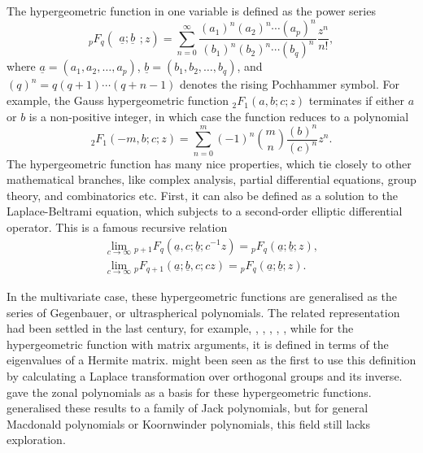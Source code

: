 \documentclass{amsart}
\theoremstyle{definition}
\numberwithin{equation}{section}
\begin{document}
The hypergeometric function in one variable is defined as the power series 
\[{}_{p}F_{q}\left(\begin{matrix}
    	    \underline{a}; \underline{b}\end{matrix}; z\right) = \sum _{n=0}^{\infty }{\frac {(a_1)^{n}(a_2)^{n}\cdots(a_p)^n}{(b_1)^{n}(b_2)^{n}\cdots(b_q)^n}}{\frac {z^{n}}{n!}},\]
where $\underline{a} = (a_1,a_2,\dots,a_p)$, $\underline{b} = (b_1,b_2,\dots,b_q)$, and $(q)^n =q(q+1)\cdots (q+n-1)$ denotes the rising Pochhammer symbol. For example, the Gauss hypergeometric function ${}_{2}F_{1}(a,b;c;z)$ terminates if either $a$ or $b$ is a non-positive integer, in which case the function reduces to a polynomial
\[{}_{2}F_{1}(-m,b;c;z)=\sum _{n=0}^{m}(-1)^{n}{\binom {m}{n}}{\frac {(b)^{n}}{(c)^{n}}}z^{n}.\]
The hypergeometric function has many nice properties, which tie closely to other mathematical branches, like complex analysis, partial differential equations, group theory, and combinatorics etc. First, it can also be defined as a solution to the Laplace-Beltrami equation, which subjects to a second-order elliptic differential operator. This is a famous recursive relation
    \begin{eqnarray*}
            \lim\limits_{c\to \infty}{}_{p+1}F_{q} (\underline{a},c;\underline{b};c^{-1}z) = {}_{p}F_{q} (\underline{a};\underline{b};z), \\
        \lim\limits_{c\to \infty}{}_{p}F_{q+1}(\underline{a};\underline{b},c;cz)  = {}_{p}F_{q} (\underline{a};\underline{b};z).
    \end{eqnarray*}

In the multivariate case, these hypergeometric functions are generalised as the series of Gegenbauer, or ultraspherical polynomials. The related representation had been settled in the last century, for example, \cite{szego1954singularities}, \cite{Nehari1956OnTS}, \cite{stein1971}, \cite{Zayed1980OnTS}, \cite{ebenfelt1998}, while for the hypergeometric function with matrix arguments, it is defined in terms of the eigenvalues of a Hermite matrix. \cite{herz1955} might been seen as the first to use this definition by calculating a Laplace transformation over orthogonal groups and its inverse. \cite{constantine1963some,constantine1966hotelling} gave the zonal polynomials as a basis for these hypergeometric functions. \cite{Vilenkin2010RepresentationOL} generalised these results to a family of Jack polynomials, but for general Macdonald polynomials or Koornwinder polynomials, this field still lacks exploration.
\end{document}
